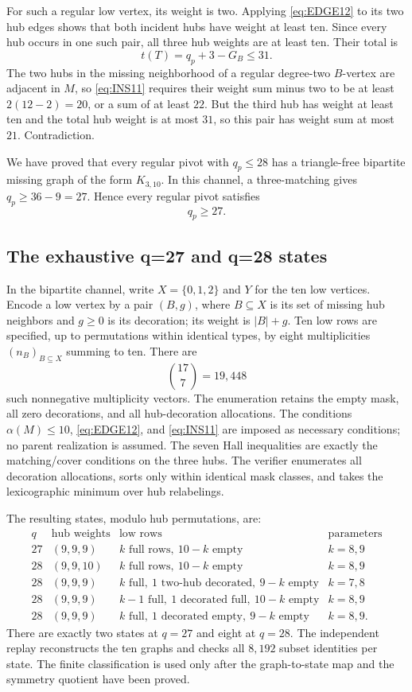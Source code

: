 For such a regular low vertex, its weight is two. Applying \cref{eq:EDGE12} to its two hub edges shows that both incident hubs have weight at least ten. Since every hub occurs in one such pair, all three hub weights are at least ten. Their total is
\[
t(T)=q_p+3-G_B\leq31.
\]
The two hubs in the missing neighborhood of a regular degree-two $B$-vertex are adjacent in $M$, so \cref{eq:INS11} requires their weight sum minus two to be at least $2(12-2)=20$, or a sum of at least $22$. But the third hub has weight at least ten and the total hub weight is at most $31$, so this pair has weight sum at most $21$. Contradiction.

We have proved that every regular pivot with $q_p\leq28$ has a triangle-free bipartite missing graph of the form $K_{3,10}$. In this channel, a three-matching gives $q_p\geq36-9=27$. Hence every regular pivot satisfies
\begin{equation}
q_p\geq27.
\label{eq:q27}
\end{equation}

\subsection{The exhaustive q=27 and q=28 states}

In the bipartite channel, write $X=\{0,1,2\}$ and $Y$ for the ten low vertices. Encode a low vertex by a pair $(B,g)$, where $B\subseteq X$ is its set of missing hub neighbors and $g\geq0$ is its decoration; its weight is $|B|+g$. Ten low rows are specified, up to permutations within identical types, by eight multiplicities $(n_B)_{B\subseteq X}$ summing to ten. There are
\[
\binom{17}{7}=19,448
\]
such nonnegative multiplicity vectors. The enumeration retains the empty mask, all zero decorations, and all hub-decoration allocations. The conditions $\alpha(M)\leq10$, \cref{eq:EDGE12}, and \cref{eq:INS11} are imposed as necessary conditions; no parent realization is assumed. The seven Hall inequalities are exactly the matching/cover conditions on the three hubs. The verifier enumerates all decoration allocations, sorts only within identical mask classes, and takes the lexicographic minimum over hub relabelings.

The resulting states, modulo hub permutations, are:
\[
\begin{array}{c|c|c|c}
q&\text{hub weights}&\text{low rows}&\text{parameters}\\ \hline
27&(9,9,9)&k\text{ full rows},\ 10-k\text{ empty}&k=8,9\\
28&(9,9,10)&k\text{ full rows},\ 10-k\text{ empty}&k=8,9\\
28&(9,9,9)&k\text{ full},\ 1\text{ two-hub decorated},\
9-k\text{ empty}&k=7,8\\
28&(9,9,9)&k-1\text{ full},\ 1\text{ decorated full},\
10-k\text{ empty}&k=8,9\\
28&(9,9,9)&k\text{ full},\ 1\text{ decorated empty},\
9-k\text{ empty}&k=8,9.
\end{array}
\]
There are exactly two states at $q=27$ and eight at $q=28$. The independent replay reconstructs the ten graphs and checks all $8,192$ subset identities per state. The finite classification is used only after the graph-to-state map and the symmetry quotient have been proved.

